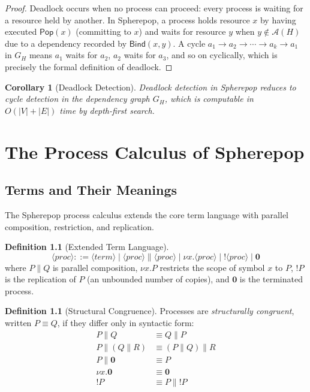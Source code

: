 \documentclass[12pt, a4paper, openany]{book}
\theoremstyle{plain}
\newtheorem{corollary}[theorem]{Corollary}
\theoremstyle{definition}
\newtheorem{definition}[theorem]{Definition}
\theoremstyle{remark}
\newcommand{\Pop}{\mathsf{Pop}}
\newcommand{\Bind}{\mathsf{Bind}}
\newcommand{\calA}{\mathcal{A}}
\begin{document}
\begin{proof}
Deadlock occurs when no process can proceed: every process is waiting for a
resource held by another. In Spherepop, a process holds resource $x$ by having
executed $\Pop(x)$ (committing to $x$) and waits for resource $y$ when $y \notin
\calA(H)$ due to a dependency recorded by $\Bind(x, y)$. A cycle $a_1 \to a_2
\to \cdots \to a_k \to a_1$ in $G_H$ means $a_1$ waits for $a_2$, $a_2$ waits
for $a_3$, and so on cyclically, which is precisely the formal definition of
deadlock.
\end{proof}

\begin{corollary}[Deadlock Detection]
Deadlock detection in Spherepop reduces to cycle detection in the dependency
graph $G_H$, which is computable in $O(|V| + |E|)$ time by depth-first search.
\end{corollary}

\chapter{The Process Calculus of Spherepop}

\section{Terms and Their Meanings}

The Spherepop process calculus extends the core term language with parallel
composition, restriction, and replication.

\begin{definition}[Extended Term Language]
\[
\langle\mathit{proc}\rangle ::=
  \langle\mathit{term}\rangle
  \mid \langle\mathit{proc}\rangle \parallel \langle\mathit{proc}\rangle
  \mid \nu x.\langle\mathit{proc}\rangle
  \mid {!}\langle\mathit{proc}\rangle
  \mid \mathbf{0}
\]
where $P \parallel Q$ is parallel composition, $\nu x.P$ restricts the scope
of symbol $x$ to $P$, ${!}P$ is the replication of $P$ (an unbounded number
of copies), and $\mathbf{0}$ is the terminated process.
\end{definition}

\begin{definition}[Structural Congruence]
Processes are \emph{structurally congruent}, written $P \equiv Q$, if they
differ only in syntactic form:
\begin{align*}
P \parallel Q &\equiv Q \parallel P \\
P \parallel (Q \parallel R) &\equiv (P \parallel Q) \parallel R \\
P \parallel \mathbf{0} &\equiv P \\
\nu x.\mathbf{0} &\equiv \mathbf{0} \\
{!}P &\equiv P \parallel {!}P
\end{align*}
\end{definition}
\end{document}
